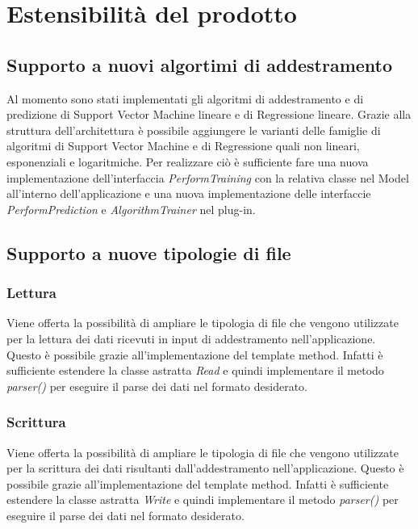 \section{Estensibilità del prodotto}
	\subsection{Supporto a nuovi algortimi di addestramento}
	Al momento sono stati implementati gli algoritmi di addestramento e di predizione di Support Vector Machine lineare e di Regressione lineare. Grazie alla struttura dell'architettura è possibile aggiungere le varianti delle famiglie di algoritmi di Support Vector Machine e di Regressione quali non lineari, esponenziali e logaritmiche.
	Per realizzare ciò è sufficiente fare una nuova implementazione dell'interfaccia \textit{PerformTraining} con la relativa classe nel Model all'interno dell'applicazione e una nuova implementazione delle interfaccie \textit{PerformPrediction} e \textit{AlgorithmTrainer} nel plug-in.
	\subsection{Supporto a nuove tipologie di file}
		\subsubsection{Lettura}
		Viene offerta la possibilità di ampliare le tipologia di file che vengono utilizzate per la lettura dei dati ricevuti in input di addestramento nell'applicazione. Questo è possibile grazie all'implementazione del template method. Infatti è sufficiente estendere la classe astratta \textit{Read} e quindi implementare il metodo \textit{parser()} per eseguire il parse dei dati nel formato desiderato.
		\subsubsection{Scrittura}
		Viene offerta la possibilità di ampliare le tipologia di file che vengono utilizzate per la scrittura dei dati risultanti dall'addestramento nell'applicazione. Questo è possibile grazie all'implementazione del template method. Infatti è sufficiente estendere la classe astratta \textit{Write} e quindi implementare il metodo \textit{parser()} per eseguire il parse dei dati nel formato desiderato.